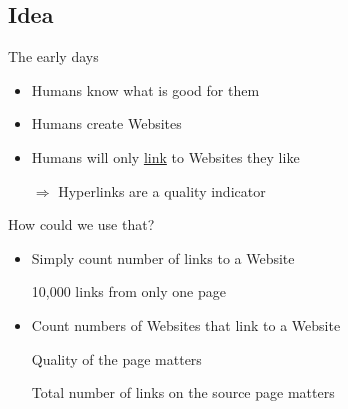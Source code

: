 \subsection{Idea}
\begin{frame}{The early days}
    \begin{itemize}[<+->]
        \item Humans know what is good for them
        \item Humans create Websites
        \item Humans will only \href{http://en.wikipedia.org/wiki/Hyperlink}{link} to Websites they like
        \item[$\Rightarrow$] Hyperlinks are a quality indicator
    \end{itemize}
\end{frame}

\begin{frame}{How could we use that?}
    \begin{itemize}[<+->]
        \item Simply count number of links to a Website
        \item[\xmark] 10,000 links from only one page
        \item Count numbers of Websites that link to a Website
        \item[\xmark] Quality of the page matters
        \item[\xmark] Total number of links on the source page matters
    \end{itemize}
\end{frame}

